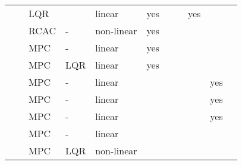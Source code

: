 \begin{landscape}
{\begin{table}[!htbp]
\begin{tabularx}{\linewidth}{@{}lllllllllll@{}}
            \citet{Slabber2020}          & \citeyear{Slabber2020}          & \gls{LQR}                  &                        & linear               & yes                &                  &                     & yes                &                    &                  \\
            \citet{Dai2014}              & \citeyear{Dai2014}              & \gls{RCAC}                 & -                      & non-linear           & yes                &                  &                     &                    &                    &                  \\
            \citet{Santos2016}           & \citeyear{Santos2016}           & \gls{MPC}                  & -                      & linear               & yes                &                  &                     &                    &                    &                  \\
            \citet{Andrade2016}          & \citeyear{Andrade2016}          & \gls{MPC}                  & \gls{LQR}              & linear               & yes                &                  &                     &                    &                    &                  \\
            \citet{Zurn2016}             & \citeyear{Zurn2016}             & \gls{MPC}                  & -                      & linear               &                    &                  &                     &                    & yes                &                  \\
            \citet{Son2019}              & \citeyear{Son2019}              & \gls{MPC}                  & -                      & linear               &                    &                  &                     &                    & yes                &                  \\
            \citet{Son2018}              & \citeyear{Son2018}              & \gls{MPC}                  & -                      & linear               &                    &                  &                     &                    & yes                &                  \\
            \citet{Son2017}              & \citeyear{Son2017}              & \gls{MPC}                  & -                      & linear               &                    &                  &                     &                    &                    &                  \\
            \citet{Trachte2014}          & \citeyear{Trachte2014}          & \gls{MPC}                  & \gls{LQR}              & non-linear           &                    &                  &                     &                    &                    &                  \\

\end{tabularx}
\end{table}}
\end{landscape}
